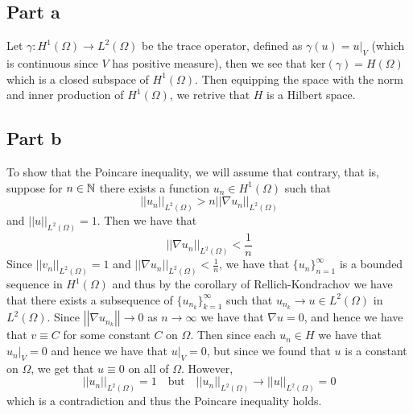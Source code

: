 \documentclass[12pt]{report}
\newcommand{\norm}[1]{\left|\left|#1\right|\right|}
\begin{document}
\subsection*{Part a}
Let $\gamma: H^1(\Omega) \to L^2(\Omega)$ be the trace operator, defined as $\gamma(u) = u|_V$ (which is continuous since $V$ has positive measure), then we see that $\text{ker}(\gamma) = H(\Omega)$ which is a closed subspace of $H^1(\Omega)$. Then equipping the space with the norm and inner production of $H^1(\Omega)$, we retrive that $H$ is a Hilbert space.

\subsection*{Part b}
To show that the Poincare inequality, we will assume that contrary, that is, suppose for $n \in \mathbb{N}$ there exists a function $u_n \in H^1(\Omega)$ such that
\begin{equation*}
  \norm{u_n}_{L^2(\Omega)} > n \norm{\nabla u_n}_{L^2(\Omega)}
\end{equation*}
and $\norm{u}_{L^2(\Omega)} = 1$. Then we have that
\begin{equation*}
  \norm{\nabla u_n}_{L^2(\Omega)} < \frac{1}{n}
\end{equation*}
Since $\norm{v_n}_{L^2(\Omega)} = 1$ and $\norm{\nabla u_n}_{L^2(\Omega)} < \frac{1}{n}$, we have that $\{u_n\}_{n=1}^\infty$ is a bounded sequence in $H^1(\Omega)$ and thus by the corollary of Rellich-Kondrachov we have that there exists a subsequence of $\{u_{n_k}\}_{k=1}^\infty$ such that $u_{n_k} \to u \in L^2(\Omega)$ in $L^2(\Omega)$. Since $\norm{\nabla u_{n_k}} \to 0$ as $n \to \infty$ we have that $\nabla u = 0$, and hence we have that $v \equiv C$ for some constant $C$ on $\Omega$. Then since each $u_n \in H$ we have that $u_n|_V = 0$ and hence we have that $u|_V = 0$, but since we found that $u$ is a constant on $\Omega$, we get that $u \equiv 0$ on all of $\Omega$. However,
\begin{equation*}
  \norm{u_n}_{L^2(\Omega)} = 1 \quad \text{but} \quad \norm{u_n}_{L^2(\Omega)} \to \norm{u}_{L^2(\Omega)} = 0
\end{equation*}
which is a contradiction and thus the Poincare inequality holds.
\end{document}
